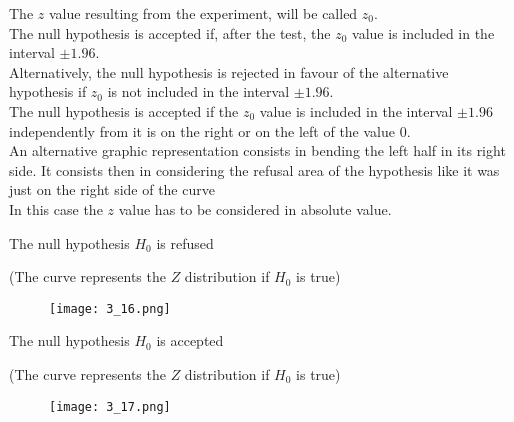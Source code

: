 \begin{frame}
  \vspace*{.25cm}
  The  $ z $ value resulting from the experiment, will be called $ z_0 $.\\
  \vspace*{.25cm}
  The null hypothesis is accepted if, after the test, the $ z_0 $ value is included in the interval $ \pm 1.96 $.\\
  \vspace*{.25cm}
  Alternatively, the null hypothesis is rejected in favour of the alternative hypothesis if $ z_0 $ is not included in the interval $ \pm 1.96 $.\\
  \vspace*{.25cm}
  The null hypothesis is accepted if the $ z_0 $ value is included in the interval $\pm1.96$ independently from it is on the right or on the left of the value 0.\\
  \vspace*{.25cm}
  An alternative graphic representation consists in bending the left half in its right side. It consists then in considering the refusal area of the hypothesis like it was just on the right side of the curve \\
  In this case the $ z $ value has to be considered in absolute value.
\end{frame}

\begin{frame}
  \vspace*{.25cm}
  \centering
  The null hypothesis $ H_0 $ is refused\\
  \begin{tiny} (The curve represents the $ Z $ distribution if $ H_0 $ is true) \end{tiny}
  \begin{figure}
    \texttt{[image: 3\_16.png]}
  \end{figure}
\end{frame}

\begin{frame}
  \vspace*{.25cm}
  \centering
  The null hypothesis $ H_0 $ is accepted\\
  \begin{tiny} (The curve represents the $ Z $ distribution if $ H_0 $ is true) \end{tiny}
  \begin{figure}
    \texttt{[image: 3\_17.png]}
  \end{figure}
\end{frame}


